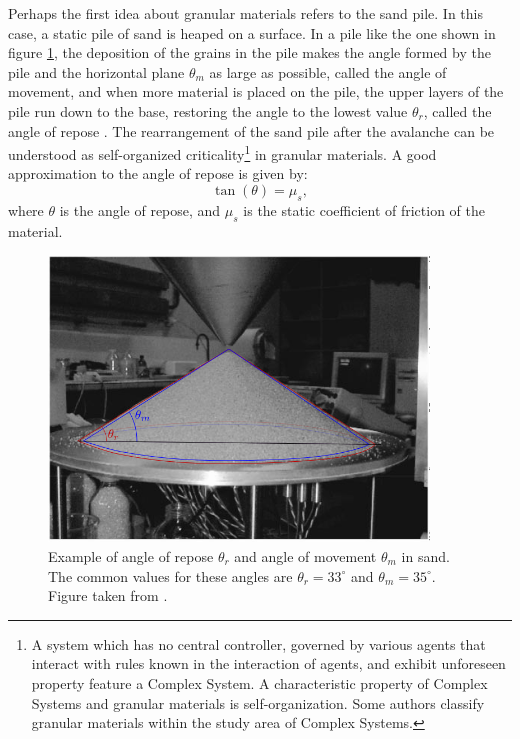     Perhaps the first idea about granular materials refers to the sand pile. In this case, a static pile of sand is heaped on a surface. In a pile like the one shown in figure \ref{fig:angulo_repouso}, the deposition of the grains in the pile makes the angle formed by the pile and the horizontal plane $\theta _m$ as large as possible, called the angle of movement, and when more material is placed on the pile, the upper layers of the pile run down to the base, restoring the angle to the lowest value $\theta _r$, called the angle of repose \cite{Sands_Powders_and_Grains, Granular_Physics}. The rearrangement of the sand pile after the avalanche can be understood as self-organized criticality\footnote{A system which has no central controller, governed by various agents that interact with rules known in the interaction of agents, and exhibit unforeseen property feature a Complex System. A characteristic property of Complex Systems and granular materials is self-organization. Some authors \cite{Avalanche_Dynamics_in_a_Pile_of_Rice, Avalanche_Prediction_in_a_Self-Organized_Pile_of_Beads, Mixing_and_Segregation_of_Granular_Materials, Measuring_the_flowing_properties_of_powders_and_grains, Revisiting_localized_deformation_in_sand_with_complex_systems, Granular_matter_and_networks, Patterns_and_collective_behavior_in_granular_media, Florent-Tese} classify granular materials within the study area of Complex Systems.} in granular materials. A good approximation to the angle of repose is given by:
    \begin{equation}
        \label{equ:atrito}
        \tan(\theta) = \mu _s ,
    \end{equation}
where $\theta$ is the angle of repose, and $\mu _s$ is the static coefficient of friction of the material.

    \begin{figure}
        \centering
        \includegraphics[width=0.9\textwidth]{04-figuras/Sand_Pile_GG_Experiment_Angles.png}
        \caption{Example of angle of repose $\theta _r$ and angle of movement $\theta _m$ in sand. The common values for these angles are $\theta _r = 33^{\circ}$ and $\theta _m = 35^{\circ}$. Figure taken from \cite{Memories_in_Sand}.}
        \label{fig:angulo_repouso}
    \end{figure}

